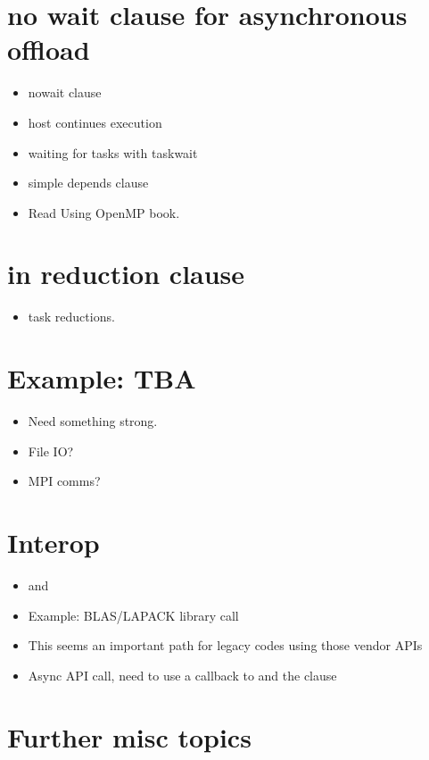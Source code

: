\section{no wait clause for asynchronous offload}
\begin{itemize}
  \item nowait clause
  \item host continues execution
  \item waiting for tasks with taskwait
  \item simple depends clause
  \item Read Using OpenMP book.
\end{itemize}

\section{in reduction clause}
\label{sec:in_reduction}
\begin{itemize}
  \item task reductions.
\end{itemize}


\section{Example: TBA}
\begin{itemize}
  \item Need something strong.
  \item File IO?
  \item MPI comms?
\end{itemize}



\section{Interop}
\label{sec:interop}
\begin{itemize}
  \item {} and 
  \item Example: BLAS/LAPACK library call
  \item This seems an important path for legacy codes using those vendor APIs
  \item Async API call, need to use a callback to  and the  clause
\end{itemize}

\section{Further misc topics}
